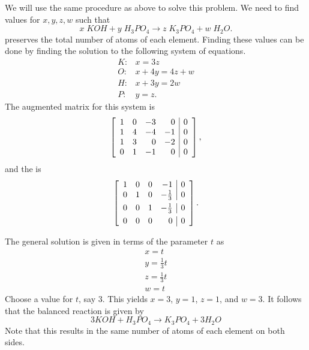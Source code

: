 \begin{solution}
We will use the same procedure as above to solve this problem. We need to find values for 
$x,y,z,w$ such that  
\begin{equation*}
x\;KOH+y\;H_{3}PO_{4}\rightarrow z\;K_{3}PO_{4}+w\;H_{2}O.
\end{equation*}
preserves the total number of atoms of each element. 
Finding these values can be done by finding the solution to the following system of equations.
\begin{equation*}
\begin{array}{cl}
K: & x=3z \\ 
O: & x+4y=4z+w \\ 
H: & x+3y=2w \\ 
P: & y=z.
\end{array}
\end{equation*}
The augmented matrix for this system is 
\begin{equation*}
\left[ 
\begin{array}{rrrr|r}
1 & 0 & -3 & 0 & 0 \\ 
1 & 4 & -4 & -1 & 0 \\ 
1 & 3 & 0 & -2 & 0 \\ 
0 & 1 & -1 & 0 & 0
\end{array}
\right],
\end{equation*}
and the {\rref} is
\begin{equation*}
\leftB
\begin{array}{rrrr|r}
1 & 0 & 0 & -1 & 0 \\ 
0 & 1 & 0 & -\vspace{0.05in}\frac{1}{3} & 0 \\ 
0 & 0 & 1 & -\vspace{0.05in}\frac{1}{3} & 0 \\ 
0 & 0 & 0 & 0 & 0
\end{array}
\rightB.
\end{equation*}

The general solution is given in terms of the parameter $t$ as 
\begin{equation*}
\begin{array}{c}
x = t \\
y = \frac{1}{3}t \\
z = \frac{1}{3}t \\
w = t
\end{array}
\end{equation*}
Choose a value for $t$, say $3$. This yields $x=3$, $y=1$, $z=1$, and
$w=3$. It follows that the balanced reaction is given by
\begin{equation*}
3KOH+H_{3}PO_{4}\rightarrow K_{3}PO_{4}+3H_{2}O
\end{equation*}
Note that this results in the same number of atoms of each element on both sides.
\end{solution}


